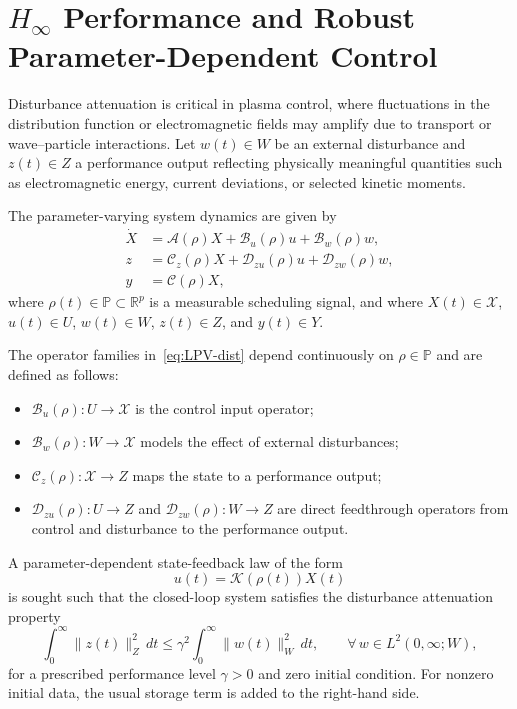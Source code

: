 \documentclass[AMA,Times2COL]{WileyNJDv5}
\begin{document}
\section{\texorpdfstring{$H_\infty$}{H-infinity} Performance and Robust Parameter-Dependent Control}
\label{sec:Hinf}

Disturbance attenuation is critical in plasma control, where fluctuations in the distribution function or electromagnetic fields may amplify due to transport or wave--particle interactions. Let $w(t)\in W$ be an external
disturbance and $z(t)\in Z$ a performance output reflecting physically meaningful quantities such as electromagnetic energy, current deviations, or selected kinetic moments.

The parameter-varying system dynamics are given by
\begin{equation}\label{eq:LPV-dist}
\begin{aligned}
\dot{X} &= \mathcal{A}(\rho)X + \mathcal{B}_u(\rho)u
+ \mathcal{B}_w(\rho)w, \\
z &= \mathcal{C}_z(\rho)X + \mathcal{D}_{zu}(\rho)u
+ \mathcal{D}_{zw}(\rho)w, \\
y &= \mathcal{C}(\rho)X,
\end{aligned}
\end{equation}
where $\rho(t)\in\mathbb{P}\subset\mathbb{R}^p$ is a measurable scheduling signal, and where $X(t)\in\mathscr X$, $u(t)\in U$, $w(t)\in W$, $z(t)\in Z$, and $y(t)\in Y$.

The operator families in~\eqref{eq:LPV-dist} depend continuously on $\rho\in\mathbb{P}$ and are defined as follows:
\begin{itemize}
  \item $\mathcal{B}_u(\rho):U\to\mathscr X$ is the control input operator;
  \item $\mathcal{B}_w(\rho):W\to\mathscr X$ models the effect of external disturbances;
  \item $\mathcal{C}_z(\rho):\mathscr X\to Z$ maps the state to a performance output;
  \item $\mathcal{D}_{zu}(\rho):U\to Z$ and
  $\mathcal{D}_{zw}(\rho):W\to Z$ are direct feedthrough operators from control and disturbance to the performance output.
\end{itemize}

A parameter-dependent state-feedback law of the form
\[
u(t)=\mathcal{K}(\rho(t))X(t)
\]
is sought such that the closed-loop system satisfies the disturbance attenuation property
\begin{equation}\label{eq:Hinf-goal}
\int_{0}^{\infty} \|z(t)\|_{Z}^{2}\,dt
\le
\gamma^{2}\int_{0}^{\infty} \|w(t)\|_{W}^{2}\,dt,
\qquad
\forall\, w\in L^{2}(0,\infty;W),
\end{equation}
for a prescribed performance level $\gamma>0$ and zero initial condition. For nonzero initial data, the usual storage term is added to the right-hand side.
\end{document}
